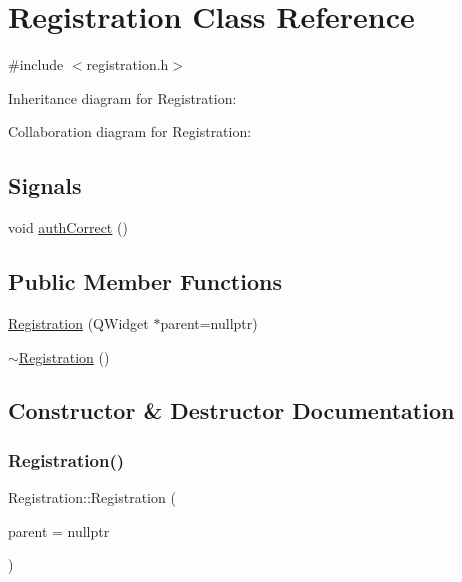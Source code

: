 \hypertarget{class_registration}{}\section{Registration Class Reference}
\label{class_registration}


{\ttfamily \#include $<$registration.\+h$>$}



Inheritance diagram for Registration\+:


Collaboration diagram for Registration\+:
\subsection*{Signals}
\begin{DoxyCompactItemize}
\item 
void \mbox{\hyperlink{class_registration_a509fdfd1458f4cdf30209998ba1ccf33}{auth\+Correct}} ()
\end{DoxyCompactItemize}
\subsection*{Public Member Functions}
\begin{DoxyCompactItemize}
\item 
\mbox{\hyperlink{class_registration_a2caa0ec4819473d5a6a84190414f24b9}{Registration}} (Q\+Widget $\ast$parent=nullptr)
\item 
\mbox{\hyperlink{class_registration_af0515fb621bcf46276090b7b26f88fc4}{$\sim$\+Registration}} ()
\end{DoxyCompactItemize}


\subsection{Constructor \& Destructor Documentation}
\mbox{\label{class_registration_a2caa0ec4819473d5a6a84190414f24b9}} 
\subsubsection{\texorpdfstring{Registration()}{Registration()}}
{\footnotesize\ttfamily Registration\+::\+Registration (\begin{DoxyParamCaption}\item[{Q\+Widget $\ast$}]{parent = {\ttfamily nullptr} }\end{DoxyParamCaption})\hspace{0.3cm}{\ttfamily [explicit]}}

